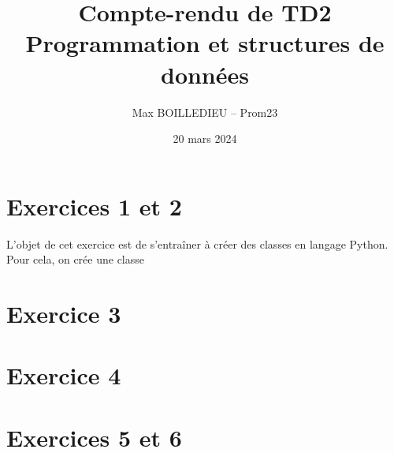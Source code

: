 \documentclass[a4paper, 12pt]{article}
\title{Compte-rendu de TD2 \\ Programmation et structures de données}
\author{Max BOILLEDIEU -- Prom23}
\date{20 mars 2024}
\begin{document}
\maketitle 

\tableofcontents

\clearpage

\section{Exercices 1 et 2}
L'objet de cet exercice est de s'entraîner à créer des classes en langage Python. Pour cela, on crée une classe 
\section{Exercice 3}
\section{Exercice 4}
\section{Exercices 5 et 6}
\end{document}
